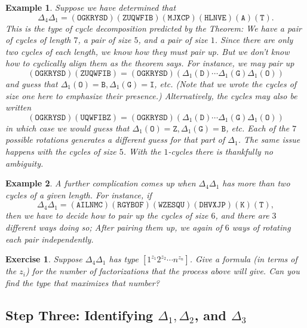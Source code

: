 \documentclass[11pt]{article}
\newtheorem{exercise}{Exercise}
\newtheorem{example}{Example}
\begin{document}
\begin{example}
    Suppose we have determined that
    \[
        \Delta_4\Delta_1 = (\mathtt{OGKRYSD})(\mathtt{ZUQWFIB})
        (\mathtt{MJXCP})(\mathtt{HLNVE})(\mathtt{A})(\mathtt{T}).
    \]
    This is the type of cycle decomposition predicted by the Theorem:
    We have a pair of cycles of length $7$, a pair of size $5$,
    and a pair of size $1$. Since there are only two cycles of each
    length, we know how they must pair up. But we don't know how to
    cyclically align them as the theorem says. For instance, we may
    pair up
    \[
        (\mathtt{OGKRYSD})(\mathtt{ZUQWFIB}) = 
        (\mathtt{OGKRYSD})(\Delta_1(\mathtt{D})\cdots\Delta_1(\mathtt{G})\Delta_1(\mathtt{O}))
    \]
    and guess that $\Delta_1(\mathtt{O}) = \mathtt{B}, \Delta_1(\mathtt{G}) =
    \mathtt{I}$, etc. (Note that we wrote the cycles of size one here to
    emphasize their presence.) Alternatively, the cycles may also be written
    \[
        (\mathtt{OGKRYSD})(\mathtt{UQWFIBZ})
        =
        (\mathtt{OGKRYSD})(\Delta_1(\mathtt{D})\cdots\Delta_1(\mathtt{G})\Delta_1(\mathtt{O}))
    \]
    in which case we would guess that $\Delta_1(\mathtt{O}) = \mathtt{Z},
    \Delta_1(\mathtt{G}) =\mathtt{B}$, etc.
    Each of the $7$ possible rotations generates a different guess for
    that part of $\Delta_1$. The same issue happens with the
    cycles of size $5$. With the $1$-cycles there is thankfully no
    ambiguity.
\end{example}
\begin{example}\label{ex:sixcycles} A further complication comes up when $\Delta_4\Delta_1$
    has more than two cycles of a given length. For instance, if
    \[
        \Delta_4\Delta_1 = (\mathtt{AILNMC})(\mathtt{RGYBOF})
        (\mathtt{WZESQU})(\mathtt{DHVXJP})(\mathtt{K})(\mathtt{T}),
    \]
    then we have to decide how to pair up the cycles of size $6$,
    and there are $3$ different ways doing so; After pairing them
    up, we again of $6$ ways of rotating each pair independently.
\end{example}

\begin{exercise}
    Suppose $\Delta_4\Delta_1$ has type $[1^{z_1}2^{z_2}\cdots n^{z_n}]$. Give
    a formula (in terms of the $z_i$) for the number of factorizations that the
    process above will give. Can you find the type that maximizes that number?
\end{exercise}

\subsection{Step Three: Identifying $\Delta_1,\Delta_2$, and $\Delta_3$}
\end{document}
